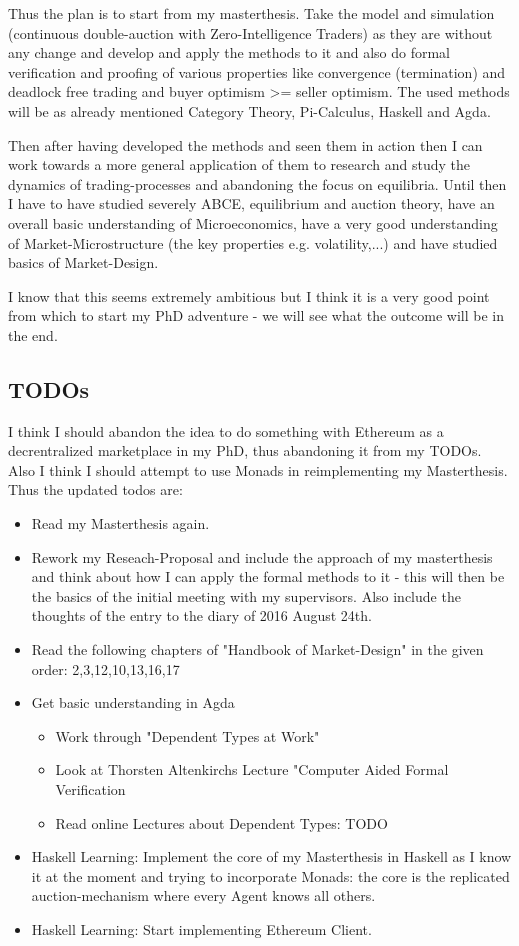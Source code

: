 Thus the plan is to start from my masterthesis. Take the model and simulation (continuous double-auction with Zero-Intelligence Traders) as they are without any change and develop and apply the methods to it and also do formal verification and proofing of various properties like convergence (termination) and deadlock free trading and buyer optimism >= seller optimism. The used methods will be as already mentioned Category Theory, Pi-Calculus, Haskell and Agda.

\bigskip

Then after having developed the methods and seen them in action then I can work towards a more general application of them to research and study the dynamics of trading-processes and abandoning the focus on equilibria. Until then I have to have studied severely ABCE, equilibrium and auction theory, have an overall basic understanding of Microeconomics, have a very good understanding of Market-Microstructure (the key properties e.g. volatility,...) and have studied basics of Market-Design.

\bigskip

I know that this seems extremely ambitious but I think it is a very good point from which to start my PhD adventure - we will see what the outcome will be in the end.

\subsection*{TODOs}
I think I should abandon the idea to do something with Ethereum as a decrentralized marketplace in my PhD, thus abandoning it from my TODOs. Also I think I should attempt to use Monads in reimplementing my Masterthesis. \\ Thus the updated todos are:

\begin{itemize}
\item Read my Masterthesis again.
\item Rework my Reseach-Proposal and include the approach of my masterthesis and think about how I can apply the formal methods to it - this will then be the basics of the initial meeting with my supervisors. Also include the thoughts of the entry to the diary of 2016 August 24th.
\item Read the following chapters of "Handbook of Market-Design" in the given order: 2,3,12,10,13,16,17
\item Get basic understanding in Agda 
	\begin{itemize}
	\item Work through "Dependent Types at Work"
	\item Look at Thorsten Altenkirchs Lecture "Computer Aided Formal Verification
	\item Read online Lectures about Dependent Types: TODO
	\end{itemize}
\item Haskell Learning: Implement the core of my Masterthesis in Haskell as I know it at the moment and trying to incorporate Monads: the core is the replicated auction-mechanism where every Agent knows all others.
\item Haskell Learning: Start implementing Ethereum Client.
\end{itemize}
